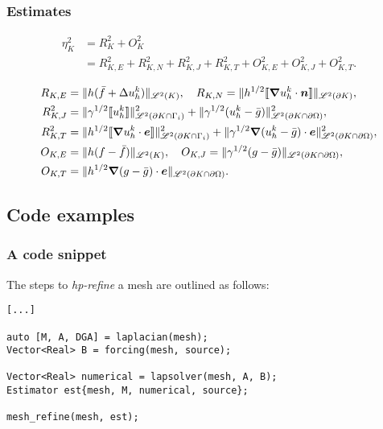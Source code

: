 \begin{frame}[fragile]
    \frametitle{Estimates}

    \begin{align}
        \eta_K^2 &= R_K^2 + O_K^2 \\
        &= R_{K, E}^2 + R_{K, N}^2 + R_{K, J}^2 + R_{K, T}^2 + O_{K, E}^2 + O_{K, J}^2 + O_{K, T}^2.
    \end{align}

    \begin{align}
        R_{K, E} &= \lVert h (\bar{f} + \Delta u^k_h) \rVert_{\mathscr{L}^2(K)}, \quad R_{K, N} = \lVert h^{1/2} \llbracket \bm{\nabla} u^k_h \cdot \bm{n} \rrbracket \rVert_{\mathscr{L}^2(\partial K)}, \notag \\
        R^2_{K, J} &= \lVert \gamma^{1/2} \llbracket u^k_h \rrbracket \rVert^2_{\mathscr{L}^2(\partial K \cap \Gamma_{i})} + \lVert \gamma^{1/2} (u^k_h - \bar{g}) \rVert^2_{\mathscr{L}^2(\partial K \cap \partial \Omega)}, \notag \\
        R^2_{K, T} &= \lVert h^{1/2} \llbracket \bm{\nabla} u^k_h \cdot \bm{e} \rrbracket \rVert^2_{\mathscr{L}^2(\partial K \cap \Gamma_{i})} + \lVert \gamma^{1/2} \bm{\nabla} (u^k_h - \bar{g}) \cdot \bm{e} \rVert^2_{\mathscr{L}^2(\partial K \cap \partial \Omega)}, \notag \\
        O_{K, E} &= \lVert h (f - \bar{f}) \rVert_{\mathscr{L}^2(K)}, \quad O_{K, J} = \lVert \gamma^{1/2} (g - \bar{g}) \rVert_{\mathscr{L}^2(\partial K \cap \partial \Omega)}, \notag \\
        O_{K, T} &= \lVert h^{1/2} \bm{\nabla} (g - \bar{g}) \cdot \bm{e} \rVert_{\mathscr{L}^2(\partial K \cap \partial \Omega)}. \notag
    \end{align}

\end{frame}

\subsection{Code examples}

\begin{frame}[fragile]
    \frametitle{A code snippet}

    The steps to \textit{hp-refine} a mesh are outlined as follows:

\begin{lstlisting}[style=cpp]
[...]

auto [M, A, DGA] = laplacian(mesh);
Vector<Real> B = forcing(mesh, source);

Vector<Real> numerical = lapsolver(mesh, A, B);
Estimator est{mesh, M, numerical, source};

mesh_refine(mesh, est);
\end{lstlisting}

\end{frame}